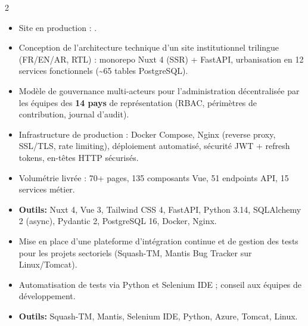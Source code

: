 \documentclass[10pt,a4paper,ragged2e,withhyper]{altacv}
\begin{document}
\begin{paracol}{2}
            \begin{itemize}
                \item Site en production : .
                \item Conception de l'architecture technique d'un site institutionnel trilingue (FR/EN/AR, RTL) : monorepo Nuxt 4 (SSR) + FastAPI, urbanisation en 12 services fonctionnels (\textasciitilde65 tables PostgreSQL).
                \item Modèle de gouvernance multi-acteurs pour l'administration décentralisée par les équipes des \textbf{14 pays} de représentation (RBAC, périmètres de contribution, journal d'audit).
                \item Infrastructure de production : Docker Compose, Nginx (reverse proxy, SSL/TLS, rate limiting), déploiement automatisé, sécurité JWT + refresh tokens, en-têtes HTTP sécurisés.
                \item Volumétrie livrée : 70+ pages, 135 composants Vue, 51 endpoints API, 15 services métier.
                \item \textcolor{SecondaryColor}{\textbf{Outils: }} Nuxt 4, Vue 3, Tailwind CSS 4, FastAPI, Python 3.14, SQLAlchemy 2 (async), Pydantic 2, PostgreSQL 16, Docker, Nginx.
            \end{itemize}

        \divider

        \begin{itemize}
            \item Mise en place d'une plateforme d'intégration continue et de gestion des tests pour les projets sectoriels (Squash-TM, Mantis Bug Tracker sur Linux/Tomcat).
            \item Automatisation de tests via Python et Selenium IDE ; conseil aux équipes de développement.
            \item \textcolor{SecondaryColor}{\textbf{Outils: }} Squash-TM, Mantis, Selenium IDE, Python, Azure, Tomcat, Linux.
        \end{itemize}


\end{paracol}
\end{document}
